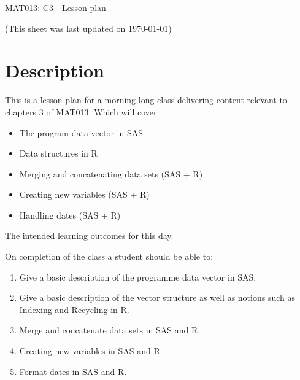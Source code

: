 \documentclass[12pt]{article}
\begin{document}
\begin{center}
\huge{MAT013: C3 - Lesson plan}
\end{center}
\begin{center}
\tiny{(This sheet was last updated on \today)}
\end{center}



\section{Description}

This is a lesson plan for a morning long class delivering content relevant to chapters 3 of MAT013. Which will cover:

\begin{itemize}
\item The program data vector in SAS
\item Data structures in R
\item Merging and concatenating data sets (SAS + R)
\item Creating new variables (SAS + R)
\item Handling dates (SAS + R)
\end{itemize}

The intended learning outcomes for this day.

On completion of the class a student should be able to:

\begin{enumerate}[label=\Alph*]
\item Give a basic description of the programme data vector in SAS.
\item Give a basic description of the vector structure as well as notions such as Indexing and Recycling in R.
\item Merge and concatenate data sets in SAS and R.
\item Creating new variables in SAS and R.
\item Format dates in SAS and R.
\end{enumerate}
\end{document}

